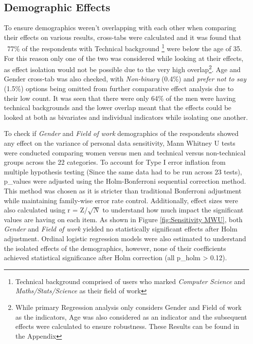 \subsection{Demographic Effects} \label{subsub:demo effects}

To ensure demographics weren't overlapping with each other when comparing their effects on various results, cross-tabs \addcite{} were calculated and it was found that ~77\% of the respondents with Technical background \footnote{Technical background comprised of users who marked \textit{Computer Science} and \textit{Maths/Stats/Science} as their field of work} were below the age of 35. For this reason only one of the two was considered while looking at their effects, as effect isolation would not be possible due to the very high overlap\footnote{While primary Regression analysis only considers Gender and Field of work as the indicators, Age was also considered as an indicator and the subsequent effects were calculated to ensure robustness. These Results can be found in the Appendix}. Age and Gender cross-tab was also checked, with \textit{Non-binary} (0.4\%) and \textit{prefer not to say} (1.5\%) options being omitted from further comparative effect analysis due to their low count. It was seen that there were only 64\% of the men were having technical backgrounds and the lower overlap meant that the effects could be looked at both as bivariates and individual indicators while isolating one another. 

To check if \textit{Gender} and \textit{Field of work} demographics of the respondents showed any effect on the variance of personal data sensitivity, Mann Whitney U tests were conducted comparing women versus men and technical versus non-technical groups across the 22 categories. To account for Type I error inflation from multiple hypothesis testing (Since the same data had to be run across 23 tests), p\_values were adjusted using the Holm-Bonferroni sequential correction method. This method was chosen as it is stricter than traditional Bonferroni adjustment while maintaining family-wise error rate control. Additionally, effect sizes were also calculated using r = Z/$\sqrt{N}$ %
to understand how much impact the significant values are having on each item. As shown in Figure \ref{fig:Sensitivity MWU}, both \textit{Gender} and \textit{Field of work} yielded no statistically significant effects after Holm adjustment. Ordinal logistic regression models were also estimated to understand the isolated effects of the demographics, however, none of their coefficients achieved statistical significance after Holm correction (all p\_holm > 0.12).    


